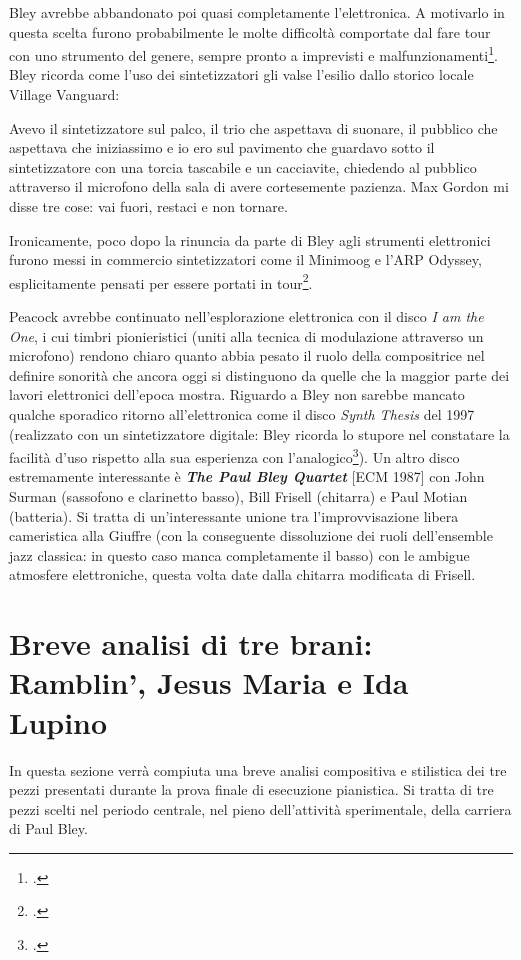Bley avrebbe abbandonato poi quasi completamente l'elettronica. A motivarlo in questa scelta furono probabilmente le molte difficoltà comportate dal fare tour con uno strumento del genere, sempre pronto a imprevisti e malfunzionamenti\footcite[114]{stopping}. Bley ricorda come l'uso dei sintetizzatori gli valse l'esilio dallo storico locale Village Vanguard: 
\begin{fquote}
	Avevo il sintetizzatore sul palco, il trio che aspettava di suonare, il pubblico che aspettava che iniziassimo e io ero sul pavimento che guardavo sotto il sintetizzatore con una torcia tascabile e un cacciavite, chiedendo al pubblico attraverso il microfono della sala di avere cortesemente pazienza. Max Gordon mi disse tre cose: vai fuori, restaci e non tornare.
\end{fquote}
Ironicamente, poco dopo la rinuncia da parte di Bley agli strumenti elettronici furono messi in commercio sintetizzatori come il Minimoog e l'ARP Odyssey, esplicitamente pensati per essere portati in tour\footcite[321]{gluck}. \par Peacock avrebbe continuato nell'esplorazione elettronica con il disco \textit{I am the One}, i cui timbri pionieristici (uniti alla tecnica di modulazione attraverso un microfono) rendono chiaro quanto abbia pesato il ruolo della compositrice nel definire sonorità che ancora oggi si distinguono da quelle che la maggior parte dei lavori elettronici dell'epoca mostra. 
Riguardo a Bley non sarebbe mancato qualche sporadico ritorno all'elettronica come il disco \textit{Synth Thesis} del 1997 (realizzato con un sintetizzatore digitale: Bley ricorda lo stupore nel constatare la facilità d'uso rispetto alla sua esperienza con l'analogico\footcite[148]{stopping}). Un altro disco estremamente interessante è \textit{\textbf{The Paul Bley Quartet}} [ECM 1987] con John Surman (sassofono e clarinetto basso), Bill Frisell (chitarra) e Paul Motian (batteria). Si tratta di un'interessante unione tra l'improvvisazione libera cameristica alla Giuffre (con la conseguente dissoluzione dei ruoli dell'ensemble jazz classica: in questo caso manca completamente il basso) con le ambigue atmosfere elettroniche, questa volta date dalla chitarra modificata di Frisell.
\chapter{Breve analisi di tre brani: Ramblin', Jesus Maria e Ida Lupino}
In questa sezione verrà compiuta una breve analisi compositiva e stilistica dei tre pezzi presentati durante la prova finale di esecuzione pianistica. Si tratta di tre pezzi scelti nel periodo centrale, nel pieno dell'attività sperimentale, della carriera di Paul Bley. 
